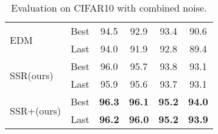 \documentclass{bmvc2k}
\begin{document}
\begin{table}[htbp]
\begin{minipage}{0.5\linewidth}
\begin{center}
{\begin{tabular}{@{}l|c|cc|cc@{}}
\multirow{2}{*}{EDM~\citep{evidentialmix}}       & Best        & \multicolumn{1}{c|}{94.5}          & 92.9          & \multicolumn{1}{c|}{93.4}          & 90.6          \\
                           & Last        & \multicolumn{1}{c|}{94.0}          & 91.9          & \multicolumn{1}{c|}{92.8}          & 89.4          \\ \midrule
\multirow{2}{*}{SSR(ours)}       & Best        & \multicolumn{1}{c|}{96.0}              &  95.7             & \multicolumn{1}{c|}{93.8}              &  93.1             \\
                           & Last        & \multicolumn{1}{c|}{95.9}              & 95.6              & \multicolumn{1}{c|}{93.7}              &  93.1          \\ \midrule
\multirow{2}{*}{SSR+(ours)}      & Best        & \multicolumn{1}{c|}{\textbf{96.3}} & \textbf{96.1} & \multicolumn{1}{c|}{\textbf{95.2}} & \textbf{94.0} \\
                           & Last        & \multicolumn{1}{c|}{\textbf{96.2}} & \textbf{96.0} & \multicolumn{1}{c|}{\textbf{95.2}} & \textbf{93.9} \\ \bottomrule
\end{tabular}}
\end{center}
\caption{Evaluation on CIFAR10 with combined noise.}
\label{openset}


\end{minipage}
\end{table}
\end{document}
